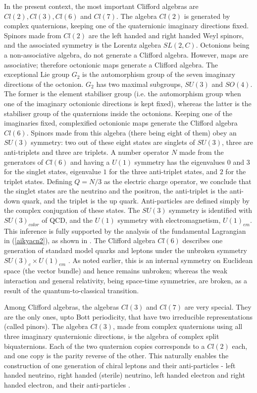 \documentclass[a4paper]{jpconf}
\begin{document}
In the present context, the most important Clifford algebras are $Cl(2), Cl(3), Cl(6)$ and $Cl(7)$. The algebra $Cl(2)$ is generated by complex quaternions, keeping one of the quaternionic imaginary directions fixed. Spinors made from $Cl(2)$ are the left handed and right handed Weyl spinors, and the associated symmetry is the Lorentz algebra $SL(2,C)$. Octonions being a non-associative algebra, do not generate a Clifford algebra. However, maps are associative; therefore octonionic maps generate a Clifford algebra. The exceptional Lie group $G_2$ is the automorphism group of the seven imaginary directions of the octonion. $G_2$ has two maximal subgroups, $SU(3)$ and $SO(4)$. The former is the element stabiliser group (i.e. the automorphism group when one of the imaginary octonionic directions is kept fixed), whereas the latter is the stabiliser group of the quaternions inside the octonions. Keeping one of the imaginaries fixed, complexified octonionic maps generate the Clifford algebra $Cl(6)$. Spinors made from this algebra (there being eight of them) obey an $SU(3)$ symmetry: two out of these eight states are singlets of $SU(3)$, three are anti-triplets and three are triplets. A number operator $N$ made from the generators of $Cl(6)$ and having a $U(1)$ symmetry has the eigenvalues $0$ and $3$ for the singlet states, eigenvalue $1$ for the three anti-triplet states, and $2$ for the triplet states. Defining   $Q=N/3$ as the electric charge operator, we conclude that the singlet states are the neutrino and the positron, the anti-triplet is the anti-down quark, and the triplet is the up quark. 
Anti-particles are defined simply by the complex conjugation of these states. The $SU(3)$ symmetry is identified with $SU(3)_{color}$ of QCD, and the $U(1)$ symmetry with electromagnetism, $U(1)_{em}$. This inference is fully supported by the analysis of the fundamental Lagrangian in (\ref{aikyacn2}), as shown in \cite{Raj}. The Clifford algebra $Cl(6)$ describes one generation of standard model quarks and leptons under the unbroken symmetry $SU(3)_c \times U(1)_{em}$ \cite{Furey1, Furey2} . As noted earlier, this is an internal symmetry on Euclidean space (the vector bundle) and hence remains unbroken; whereas the weak interaction and general relativity, being space-time symmetries, are broken, as a result of the quantum-to-classical transition.

Among Clifford algebras, the algebras $Cl(3)$ and $Cl(7)$ are very special. They are the only ones, upto Bott periodicity, that have two irreducible representations (called pinors). The algebra $Cl(3)$, made from complex quaternions using all three imaginary quaternionic directions, is the algebra of complex split biquaternions. Each of the two quaternion copies corresponds to a $Cl(2)$ each, and one 
copy is the parity reverse of the other. This naturally enables the construction of one generation of chiral leptons and their anti-particles - left handed neutrino, right handed (sterile) neutrino, left handed electron and right handed electron, and their anti-particles \cite{Vaibhav}.
\end{document}

